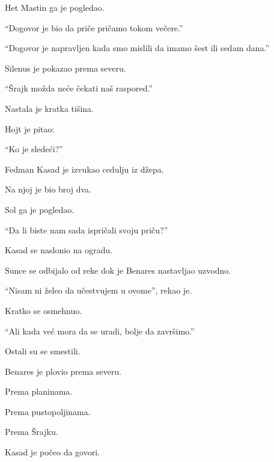 Het Mastin ga je pogledao.

``Dogovor je bio da priče pričamo tokom večere.''

``Dogovor je napravljen kada smo mislili da imamo šest ili sedam dana.''

Silenus je pokazao prema severu.

``Šrajk možda neće čekati naš raspored.''

Nastala je kratka tišina.

Hojt je pitao:

``Ko je sledeći?''

Fedman Kasad je izvukao cedulju iz džepa.

Na njoj je bio broj dva.

Sol ga je pogledao.

``Da li biste nam sada ispričali svoju priču?''

Kasad se naslonio na ogradu.

Sunce se odbijalo od reke dok je Benares nastavljao uzvodno.

``Nisam ni želeo da učestvujem u ovome'', rekao je.

Kratko se osmehnuo.

``Ali kada već mora da se uradi, bolje da završimo.''

Ostali su se smestili.

Benares je plovio prema severu.

Prema planinama.

Prema pustopoljinama.

Prema Šrajku.

Kasad je počeo da govori.
